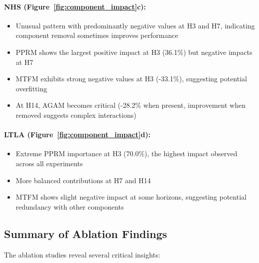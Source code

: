 \documentclass[11pt,a4paper]{article}
\begin{document}
\paragraph{NHS (Figure~\ref{fig:component_impact}c):}
\begin{itemize}
    \item Unusual pattern with predominantly negative values at H3 and H7, indicating component removal sometimes improves performance
    \item PPRM shows the largest positive impact at H3 (36.1\%) but negative impacts at H7
    \item MTFM exhibits strong negative values at H3 (-33.1\%), suggesting potential overfitting
    \item At H14, AGAM becomes critical (-28.2\% when present, improvement when removed suggests complex interactions)
\end{itemize}

\paragraph{LTLA (Figure~\ref{fig:component_impact}d):}
\begin{itemize}
    \item Extreme PPRM importance at H3 (70.0\%), the highest impact observed across all experiments
    \item More balanced contributions at H7 and H14
    \item MTFM shows slight negative impact at some horizons, suggesting potential redundancy with other components
\end{itemize}

\subsection{Summary of Ablation Findings}

The ablation studies reveal several critical insights:
\end{document}
